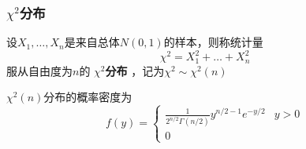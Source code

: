 \documentclass[11pt]{article}
\begin{document}
\subsubsection{\(\chi^2\)分布}
\label{sec:org3be7c40}
设\(X_1,\dots,X_n\)是来自总体\(N(0,1)\)的样本，则称统计量
\begin{equation*}
\chi^2=X_1^2+\dots+X_n^2
\end{equation*}
服从自由度为\(n\)的 \textbf{\(\chi^2\)分布} ，记为\(\chi^2\sim\chi^2(n)\)

\(\chi^2(n)\)分布的概率密度为
\begin{equation*}
f(y)=
\begin{cases}
\frac{1}{2^{n/2}\Gamma(n/2)}y^{n/2-1}e^{-y/2}&y>0\\
0&
\end{cases}
\end{equation*}
\end{document}
